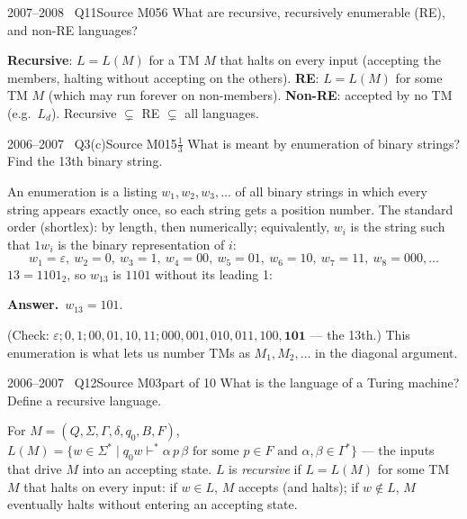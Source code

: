 \documentclass[11pt,a4paper]{article}
\newcommand{\eps}{\varepsilon}
\newcommand{\ans}[1]{\par\smallskip\noindent\colorbox{mist}{\parbox{\dimexpr\linewidth-2\fboxsep}{\sffamily\small\textbf{\color{teal}Answer.}\ \color{ink}#1}}\par}
\begin{document}
\begin{question}{2007--2008 \textbullet\ Q11}{Source M05}{6}
What are recursive, recursively enumerable (RE), and non-RE languages?
\end{question}
\begin{solution}
\textbf{Recursive}: $L=L(M)$ for a TM $M$ that halts on every input (accepting the members, halting without accepting on the others). \textbf{RE}: $L=L(M)$ for some TM $M$ (which may run forever on non-members). \textbf{Non-RE}: accepted by no TM (e.g.\ $L_d$). Recursive $\subsetneq$ RE $\subsetneq$ all languages.
\end{solution}

\begin{question}{2006--2007 \textbullet\ Q3(c)}{Source M01}{5$\tfrac13$}
What is meant by enumeration of binary strings? Find the 13th binary string.
\end{question}
\begin{solution}
An enumeration is a listing $w_1,w_2,w_3,\dots$ of all binary strings in which every string appears exactly once, so each string gets a position number. The standard order (shortlex): by length, then numerically; equivalently, $w_i$ is the string such that $1w_i$ is the binary representation of $i$:
\[ w_1=\eps,\ w_2=0,\ w_3=1,\ w_4=00,\ w_5=01,\ w_6=10,\ w_7=11,\ w_8=000,\dots \]
$13=1101_2$, so $w_{13}$ is $1101$ without its leading 1:
\ans{$w_{13}=101$.}
(Check: $\eps;0,1;00,01,10,11;000,001,010,011,100,\mathbf{101}$ --- the 13th.) This enumeration is what lets us number TMs as $M_1,M_2,\dots$ in the diagonal argument.
\end{solution}

\begin{question}{2006--2007 \textbullet\ Q12}{Source M03}{part of 10}
What is the language of a Turing machine? Define a recursive language.
\end{question}
\begin{solution}
For $M=(Q,\Sigma,\Gamma,\delta,q_0,B,F)$, $L(M)=\{w\in\Sigma^*\mid q_0w\vdash^*\alpha\,p\,\beta \text{ for some } p\in F \text{ and } \alpha,\beta\in\Gamma^*\}$ --- the inputs that drive $M$ into an accepting state. $L$ is \emph{recursive} if $L=L(M)$ for some TM $M$ that halts on every input: if $w\in L$, $M$ accepts (and halts); if $w\notin L$, $M$ eventually halts without entering an accepting state.
\end{solution}
\end{document}
